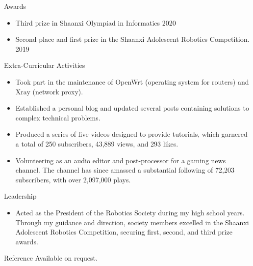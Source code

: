 \documentclass{resume} %
\begin{document}
\begin{rSection}{Awards} 
\begin{itemize}
    \item Third prize in Shaanxi Olympiad in Informatics \hfill 2020
    \item Second place and first prize in the Shaanxi Adolescent Robotics Competition. \hfill 2019
\end{itemize}
\end{rSection}
\begin{rSection}{Extra-Curricular Activities} 
\begin{itemize}
    \item 	Took part in the maintenance of OpenWrt (operating system for routers) and Xray (network proxy).
    \item	Established a personal blog and updated several posts containing solutions to complex technical problems.
    \item   Produced a series of five videos designed to provide tutorials, which garnered a total of 250 subscribers, 43,889 views, and 293 likes.
    \item   Volunteering as an audio editor and post-processor for a gaming news channel. The channel has since amassed a substantial following of 72,203 subscribers, with over 2,097,000 plays.
\end{itemize}
\end{rSection}

\begin{rSection}{Leadership} 
\begin{itemize}
    \item Acted as the President of the Robotics Society during my high school years. Through my guidance and direction, society members excelled in the Shaanxi Adolescent Robotics Competition, securing first, second, and third prize awards.
\end{itemize}
\end{rSection}

\begin{rSection}{Reference} 
    Available on request.
\end{rSection}
\end{document}
